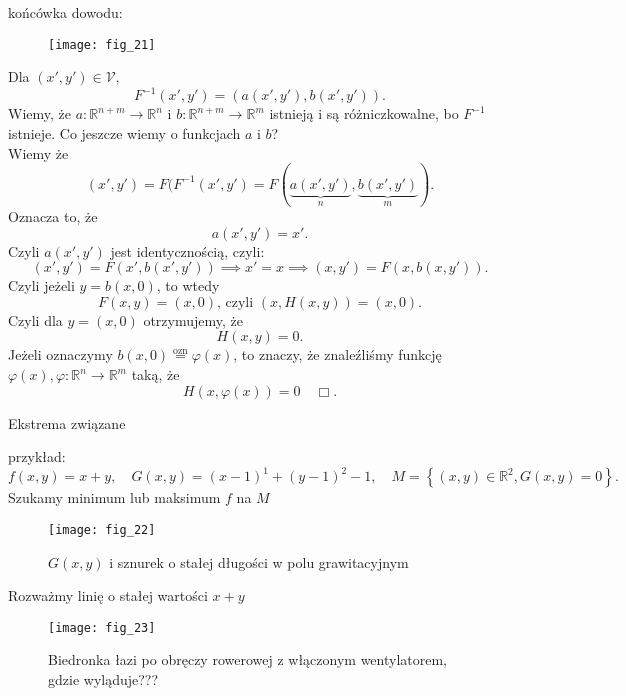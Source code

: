 \documentclass[../main.tex]{subfiles}
\begin{document}
    \begin{large}
        końcówka dowodu:
    \end{large}

    \begin{figure}
        \centering
        \texttt{[image: fig\_21]}
        \caption{}
        \label{fig:fig_21}
    \end{figure}

    Dla $(x',y')\in \mathcal{V},$
    \[
        F^{-1}(x',y') = (a(x',y'),b(x',y'))
    .\]
    Wiemy, że $a: \mathbb{R}^{n+m}\to\mathbb{R}^{n}$ i $b: \mathbb{R}^{n+m}\to\mathbb{R}^m$ istnieją i są różniczkowalne, bo $F^{-1}$ istnieje. Co jeszcze wiemy o funkcjach $a$ i $b$?\\
    Wiemy że  \[
        (x',y') = F(F^{-1}(x',y') = F(\underbrace{a(x',y')}_{n} , \underbrace{b(x',y')}_{m})
    .\]
    Oznacza to, że
    \[
        a(x',y') = x'
    .\]
    Czyli $a(x',y')$ jest identycznością, czyli:
    \[
        (x',y') = F(x',b(x',y')) \implies x'=x \implies (x,y') = F(x,b(x,y'))
    .\]
    Czyli jeżeli $y=b(x,0)$, to wtedy
    \[
        F(x,y) = (x,0)\text{, czyli } (x,H(x,y)) = (x,0)
    .\]
    Czyli dla $y = (x,0)$ otrzymujemy, że
    \[
        H(x,y)=0
    .\]
    Jeżeli oznaczymy $b(x,0) \overset{\text{ozn}}{=} \varphi(x)$, to znaczy, że znaleźliśmy funkcję $\varphi(x), \varphi:\mathbb{R}^n\to\mathbb{R}^m$ taką, że \[
        H(x,\varphi(x))=0 \quad\Box
    .\]

    \begin{definicja}
        Ekstrema związane\\

    \end{definicja}
    przykład:
    \[
        f(x,y) = x+y,\quad G(x,y) = (x-1)^1 + (y-1)^2 - 1,\quad M= \left \{ (x,y)\in\mathbb{R}^2,G(x,y) = 0\right \}
    .\]
    Szukamy minimum lub maksimum $f$ na $M$
    \begin{figure}
        \centering
        \texttt{[image: fig\_22]}
        \caption{$G(x,y)$ i sznurek o stałej długości w polu grawitacyjnym}
        \label{fig:fig_22}
    \end{figure}

    Rozważmy linię o stałej wartości $x+y$
    \begin{figure}
        \centering
        \texttt{[image: fig\_23]}
        \caption{Biedronka łazi po obręczy rowerowej z włączonym wentylatorem, gdzie wyląduje???}
        \label{fig:fig_23}
    \end{figure}
\end{document}
